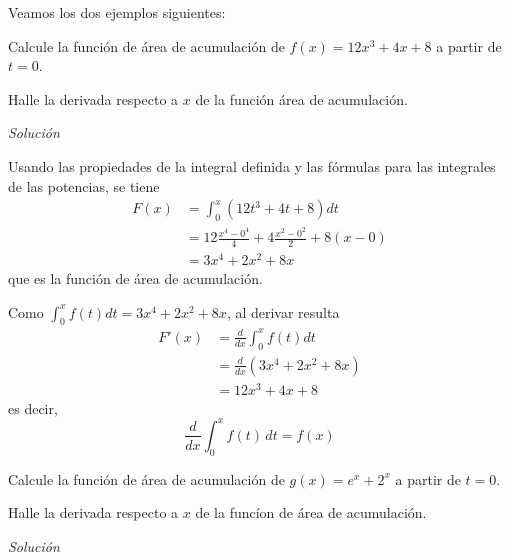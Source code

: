 \begin{ejemplo} Veamos los dos ejemplos siguientes:

\begin{parrafonumerado}

\item Calcule la función de área de acumulación de $f(x)=12x^{3}+4x+8$ a partir de $t=0$.

\item Halle la derivada respecto a $x$ de la función área de acumulación.
\end{parrafonumerado}

\end{ejemplo}

\emph{Solución}

\begin{parrafonumerado}
\item Usando las propiedades de la integral definida y las fórmulas para las integrales de las potencias, se tiene
\begin{align*}
  F(x) &=\int_{0}^{x}(12t^{3}+4t+8)dt\\
  &=12\frac{x^{4}-0^{4}}{4}+4\frac{x^{2}-0^{2}}{2}+8\left( x-0\right)\\
  &=3x^{4}+2x^{2}+8x
\end{align*}
que es la función de área de acumulación.

\item Como $\int_{0}^{x}f(t)dt=3x^{4}+2x^{2}+8x$, al derivar resulta
\begin{align*}
  F'(x) &=\frac{d}{dx}\int_{0}^{x}f(t)dt\\
  &=\frac{d}{dx}\left(3x^{4}+2x^{2}+8x\right) \\
  &=12x^{3}+4x+8
\end{align*}
es decir,
\[
  \frac{d}{dx} \int_{0}^{x} f(t)\,dt = f(x)
\]
\end{parrafonumerado}

\clearpage

\begin{ejemplo}\leavevmode
\begin{parrafonumerado}
\item Calcule la función de área de acumulación de $g(x) =e^{x}+2^{x}$ a partir de $t=0$.

\item Halle la derivada respecto a $x$ de la funcíon de área de acumulación.
\end{parrafonumerado}
\end{ejemplo}

\emph{Solución}

